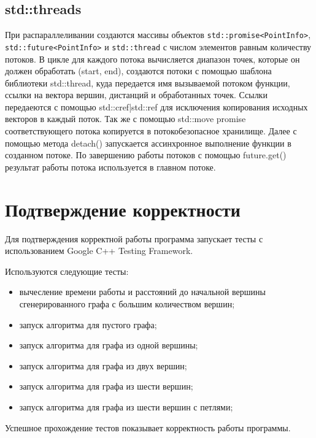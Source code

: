 \documentclass{report}
\begin{document}
\subsection*{std::threads}
\begin{sloppypar}
При распараллеливании создаются массивы объектов \verb|std::promise<PointInfo>|, \verb|std::future<PointInfo>| и \verb|std::thread| с числом элементов равным количеству потоков. В цикле для каждого потока вычисляется диапазон точек, которые он должен обработать (start, end), создаются потоки с помощью шаблона библиотеки std::thread, куда передается имя вызываемой потоком функции, ссылки на вектора вершин, дистанций и обработанных точек. Ссылки передаеются с помощью std::cref|std::ref для исключения копирования исходных векторов в каждый поток. Так же с помощью std::move promise соответствующего потока копируется в потокобезопасное хранилище. Далее с помощью метода detach() запускается ассинхронное выполнение функции в созданном потоке. По завершению работы потоков с помощью future.get() результат работы потока используется в главном потоке.
\end{sloppypar}
\newpage


\section*{Подтверждение корректности}
Для подтверждения корректной работы программа запускает тесты с использованием Google C++ Testing Framework.
\par Используются следующие тесты:
\begin{itemize}
\item вычесление времени работы и расстояний до начальной вершины сгенерированного графа с большим количеством вершин;
\item запуск алгоритма для пустого графа;
\item запуск алгоритма для графа из одной вершины;
\item запуск алгоритма для графа из двух вершин;
\item запуск алгоритма для графа из шести вершин;
\item запуск алгоритма для графа из шести вершин с петлями;
\end{itemize}
\par Успешное прохождение тестов показывает корректность работы программы.

\newpage
\end{document}
